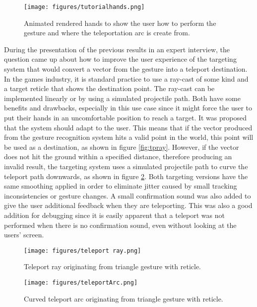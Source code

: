 \begin{figure}[!ht]
    \centering
    \texttt{[image: figures/tutorialhands.png]}
    \caption{Animated rendered hands to show the user how to perform the gesture and where the teleportation arc is create from.}
    \label{fig:tutorial}
\end{figure}

During the presentation of the previous results in an expert interview, the question came up about how to improve the user experience of the targeting system that would convert a vector from the gesture into a teleport destination. In the games industry, it is standard practice to use a ray-cast of some kind and a target reticle that shows the destination point. The ray-cast can be implemented linearly or by using a simulated projectile path. Both have some benefits and drawbacks, especially in this use case since it might force the user to put their hands in an uncomfortable position to reach a target. It was proposed that the system should adapt to the user. This means that if the vector produced from the gesture recognition system hits a valid point in the world, this point will be used as a destination, as shown in figure \ref{fig:tpray}. However, if the vector does not hit the ground within a specified distance, therefore producing an invalid result, the targeting system uses a simulated projectile path to curve the teleport path downwards, as shown in figure \ref{fig:tparc}. Both targeting versions have the same smoothing applied in order to eliminate jitter caused by small tracking inconsistencies or gesture changes. A small confirmation sound was also added to give the user additional feedback when they are teleporting. This was also a good addition for debugging since it is easily apparent that a teleport was not performed when there is no confirmation sound, even without looking at the users' screen.

\begin{figure}[!htb]
        \texttt{[image: figures/teleport ray.png]}
        \caption{Teleport ray originating from triangle gesture with reticle.}
        \label{fig:tpray}
    \endminipage\hfill
        \texttt{[image: figures/teleportArc.png]}
        \caption{Curved teleport arc originating from triangle gesture with reticle.}
        \label{fig:tparc}
    \endminipage\hfill
\end{figure}